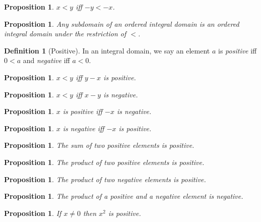 \documentclass{article}
\newtheorem{proposition}[axiom]{Proposition}
\theoremstyle{definition}
\newtheorem{definition}[axiom]{Definition}
\begin{document}
    \begin{proposition}
        $x < y$ iff $-y < -x$.
    \end{proposition}

    \begin{proposition}
        Any subdomain of an ordered integral domain is an ordered integral domain under the restriction of
        $<$.
    \end{proposition}

    \begin{definition}[Positive]
        In an integral domain, we say an element $a$ is \emph{positive} iff $0 < a$ and \emph{negative}
        iff $a < 0$.
    \end{definition}

    \begin{proposition}
        $x < y$ iff $y - x$ is positive.
    \end{proposition}

    \begin{proposition}
        $x < y$ iff $x - y$ is negative.
    \end{proposition}

    \begin{proposition}
        $x$ is positive iff $-x$ is negative.
    \end{proposition}

    \begin{proposition}
        $x$ is negative iff $-x$ is positive.
    \end{proposition}

    \begin{proposition}
        The sum of two positive elements is positive.
    \end{proposition}

    \begin{proposition}
        The product of two positive elements is positive.
    \end{proposition}

    \begin{proposition}
        The product of two negative elements is positive.
    \end{proposition}

    \begin{proposition}
        The product of a positive and a negative element is negative.
    \end{proposition}

    \begin{proposition}
        If $x \neq 0$ then $x^2$ is positive.
    \end{proposition}
\end{document}
